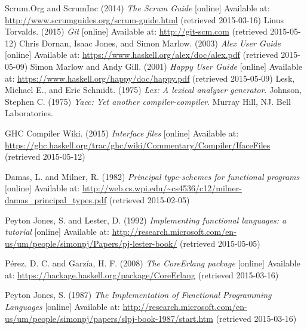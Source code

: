 \begin{thebibliography}{69}
 Scrum.Org and ScrumInc (2014) \textit{The Scrum Guide} [online] Available at: \url{http://www.scrumguides.org/scrum-guide.html} (retrieved 2015-03-16)
  Linus Torvalds. (2015) \textit{Git} [online] Available at: \url{http://git-scm.com} (retrieved 2015-05-12)
 Chris Dornan, Isaac Jones, and Simon Marlow. (2003) \textit{Alex User Guide} [online] Available at: \url{https://www.haskell.org/alex/doc/alex.pdf} (retrieved 2015-05-09)
 Simon Marlow and Andy Gill. (2001) \textit{Happy User Guide} [online] Available at: \url{https://www.haskell.org/happy/doc/happy.pdf} (retrieved 2015-05-09)
 Lesk, Michael E., and Eric Schmidt. (1975) \textit{Lex: A lexical analyzer generator}.
 Johnson, Stephen C. (1975) \textit{Yacc: Yet another compiler-compiler}. Murray Hill, NJ. Bell Laboratories.


  GHC Compiler Wiki. (2015) \textit{Interface files} [online] Available at: \url{https://ghc.haskell.org/trac/ghc/wiki/Commentary/Compiler/IfaceFiles} (retrieved 2015-05-12)

 Damas, L. and Milner, R. (1982) \textit{Principal type-schemes for functional programs} [online] Available at: \url{http://web.cs.wpi.edu/~cs4536/c12/milner-damas_principal_types.pdf} (retrieved 2015-02-05)

 Peyton Jones, S. and Lester, D. (1992) \textit{Implementing functional languages: a tutorial} [online] Available at: \url{http://research.microsoft.com/en-us/um/people/simonpj/Papers/pj-lester-book/} (retrieved 2015-05-05)


 Pérez, D. C. and Garzía, H. F. (2008) \textit{The CoreErlang package} [online] Available at: \url{https://hackage.haskell.org/package/CoreErlang} (retrieved 2015-03-16)

 Peyton Jones, S. (1987) \textit{The Implementation of Functional Programming Languages} [online] Available at: \url{http://research.microsoft.com/en-us/um/people/simonpj/papers/slpj-book-1987/start.htm} (retrieved 2015-03-16)

\end{thebibliography}
